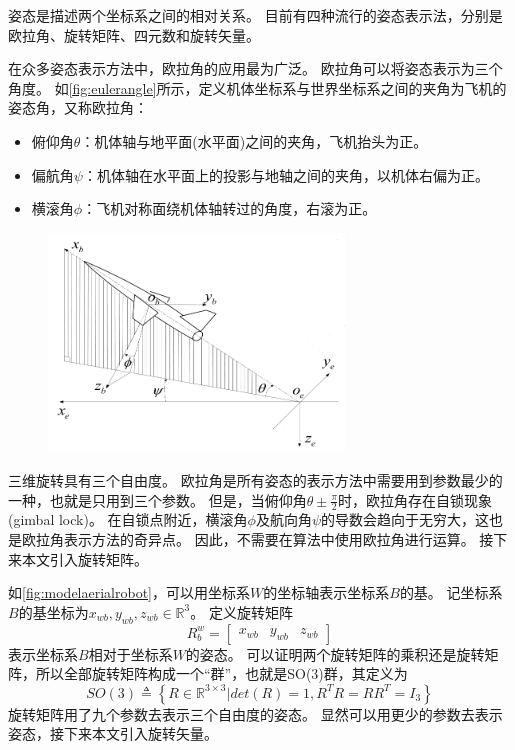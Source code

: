 \documentclass[
  type=master
]{gdutthesis}
\begin{document}
姿态是描述两个坐标系之间的相对关系。
目前有四种流行的姿态表示法，分别是欧拉角、旋转矩阵、四元数和旋转矢量\cite{shuster1993survey}。

在众多姿态表示方法中，欧拉角的应用最为广泛\cite{stuelpnagel1964parametrization}。
欧拉角可以将姿态表示为三个角度。
如\autoref{fig:eulerangle}所示，定义机体坐标系与世界坐标系之间的夹角为飞机的姿态角，又称欧拉角：
\begin{itemize}
	\item 俯仰角$\theta$：机体轴与地平面(水平面)之间的夹角，飞机抬头为正。
	\item 偏航角$\psi$：机体轴在水平面上的投影与地轴之间的夹角，以机体右偏为正。
	\item 横滚角$\phi$：飞机对称面绕机体轴转过的角度，右滚为正。
\end{itemize}
\begin{figure}[H]
	\centering
	\includegraphics[width=0.7\textwidth]{屏幕截图 2022-03-31 231147.png}
	\label{fig:eulerangle}
\end{figure}
三维旋转具有三个自由度。
欧拉角是所有姿态的表示方法中需要用到参数最少的一种，也就是只用到三个参数。
但是，当俯仰角$\theta \pm \frac{\pi}{2}$时，欧拉角存在自锁现象(gimbal lock)。
在自锁点附近，横滚角$\phi$及航向角$\psi$的导数会趋向于无穷大，这也是欧拉角表示方法的奇异点。
因此，不需要在算法中使用欧拉角进行运算。
接下来本文引入旋转矩阵。

如\autoref{fig:modelaerialrobot}，可以用坐标系$W$的坐标轴表示坐标系$B$的基。
记坐标系$B$的基坐标为$x_{wb}, y_{wb}, z_{wb} \in \mathbb{R}^3$。
定义旋转矩阵
\begin{equation}\label{eq:rotationmatrixdefinition}
	R_b^w = 
	\begin{bmatrix}
		x_{wb} & y_{wb} & z_{wb}
	\end{bmatrix}
\end{equation}
表示坐标系$B$相对于坐标系$W$的姿态。
可以证明两个旋转矩阵的乘积还是旋转矩阵，所以全部旋转矩阵构成一个“群”，也就是SO(3)群，其定义为
\begin{equation}\label{eq:so3}
	SO(3) \triangleq \left\{ R \in \mathbb{R}^{3 \times 3} | det(R) = 1, R^T R = R R^T = I_3 \right\}
\end{equation}
旋转矩阵用了九个参数去表示三个自由度的姿态。
显然可以用更少的参数去表示姿态，接下来本文引入旋转矢量。
\end{document}
